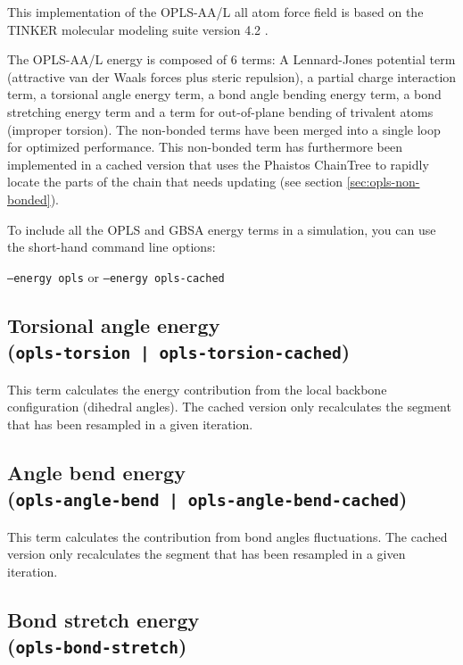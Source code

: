 This implementation of the OPLS-AA/L all atom force field
\cite{jorgensen1996development} is based on the TINKER molecular
modeling suite version 4.2 \cite{ponder2010}.

The OPLS-AA/L energy is composed of 6 terms: A Lennard-Jones potential
term (attractive van der Waals forces plus steric repulsion), a
partial charge interaction term, a torsional angle energy
term, a bond angle bending energy term, a bond stretching energy
term and a term for out-of-plane bending of trivalent atoms (improper
torsion). The non-bonded terms have been merged into a single loop for optimized
performance. This non-bonded term has furthermore been implemented in a
cached version that uses the Phaistos ChainTree to rapidly locate the
parts of the chain that needs updating (see section \ref{sec:opls-non-bonded}).

To include all the OPLS and GBSA energy terms in a simulation, you can
use the short-hand command line options:

\begin{flushleft}
\texttt{--energy opls}\hspace{1ex} or\hspace{1ex} \texttt{--energy opls-cached}
\end{flushleft}

\subsection{Torsional angle energy  \\(\texttt{opls-torsion | opls-torsion-cached})}

This term calculates the energy contribution from the local backbone
configuration (dihedral angles). The cached version only recalculates
the segment that has been resampled in a given iteration.


\subsection{Angle bend energy  \\(\texttt{opls-angle-bend | opls-angle-bend-cached})}

This term calculates the contribution from bond angles
fluctuations. The cached version only recalculates the segment that
has been resampled in a given iteration.

\subsection{Bond stretch energy \\(\texttt{opls-bond-stretch})}


